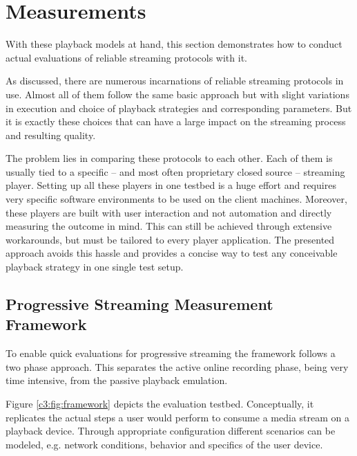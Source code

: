 \section{Measurements}
\label{c3:measurements}

With these playback models at hand, this section demonstrates how to conduct actual evaluations of reliable streaming protocols with it.

As discussed, there are numerous incarnations of reliable streaming protocols in use. Almost all of them follow the same basic approach but with slight variations in execution and choice of playback strategies and corresponding parameters. But it is exactly these choices that can have a large impact on the streaming process and resulting quality. 

The problem lies in comparing these protocols to each other. Each of them is usually tied to a specific -- and most often proprietary closed source -- streaming player. Setting up all these players in one testbed is a huge effort and requires very specific software environments to be used on the client machines. Moreover, these players are built with user interaction and not automation and directly measuring the outcome in mind. This can still be achieved through extensive workarounds, but must be tailored to every player application. The presented approach avoids this hassle and provides a concise way to test any conceivable playback strategy in one single test setup.



\subsection{Progressive Streaming Measurement Framework}

To enable quick evaluations for progressive streaming the framework follows a two phase approach. This separates the active online recording phase, being very time intensive, from the passive playback emulation.




Figure \ref{c3:fig:framework} depicts the evaluation testbed. %
Conceptually, it replicates the actual steps a user would perform to consume a media stream on a playback device. Through appropriate configuration different scenarios can be modeled, e.g. network conditions, behavior and specifics of the user device.
 

